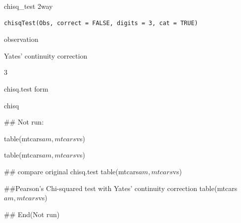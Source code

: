 \documentclass[a4paper]{book}
\begin{document}
%
\begin{Description}
chisq\_test 2way
\end{Description}
%
\begin{Usage}
\begin{verbatim}
chisqTest(Obs, correct = FALSE, digits = 3, cat = TRUE)
\end{verbatim}
\end{Usage}
%
\begin{Arguments}
\begin{ldescription}
\item[\code{Obs}] observation

\item[\code{correct}] Yates' continuity correction

\item[\code{digits}] 3

\item[\code{cat}] chisq.test form
\end{ldescription}
\end{Arguments}
%
\begin{Value}
chisq
\end{Value}
%
\begin{Examples}
\begin{ExampleCode}
\#\# Not run: 

table(mtcars$am, mtcars$vs) %


table(mtcars$am, mtcars$vs) %

## compare original chisq.test
table(mtcars$am, mtcars$vs) %


##Pearson's Chi-squared test with Yates' continuity correction
table(mtcars$am, mtcars$vs) %

## End(Not run)


\end{ExampleCode}
\end{Examples}
\end{document}
